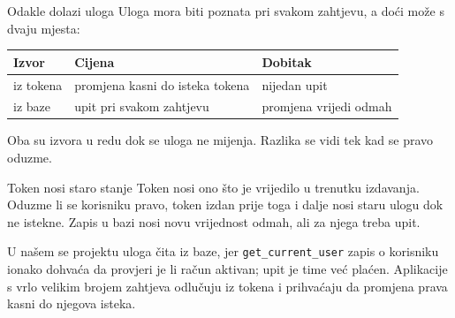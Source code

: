 \begin{frame}{Odakle dolazi uloga}
Uloga mora biti poznata pri svakom zahtjevu, a doći može s dvaju mjesta:

\vspace{0.4em}
\begin{center}
{\small
\setlength{\tabcolsep}{8pt}
\renewcommand{\arraystretch}{1.4}
\begin{tabular}{@{}lll@{}}
  \toprule
  \textbf{Izvor} & \textbf{Cijena} & \textbf{Dobitak} \\
  \midrule
  iz tokena & promjena kasni do isteka tokena & nijedan upit \\
  iz baze   & upit pri svakom zahtjevu        & promjena vrijedi odmah \\
  \bottomrule
\end{tabular}
}
\end{center}

\vspace{0.9em}
Oba su izvora u redu dok se uloga ne mijenja. Razlika se vidi tek kad se pravo oduzme.
\end{frame}

\begin{frame}{Token nosi staro stanje}
Token nosi ono što je vrijedilo u trenutku izdavanja. Oduzme li se korisniku pravo, token izdan prije toga i dalje nosi staru ulogu dok ne istekne. Zapis u bazi nosi novu vrijednost odmah, ali za njega treba upit.

\vspace{0.8em}
\begin{konvencija}
U našem se projektu uloga čita iz baze, jer \texttt{get\_current\_user} zapis o korisniku ionako dohvaća da provjeri je li račun aktivan; upit je time već plaćen. Aplikacije s vrlo velikim brojem zahtjeva odlučuju iz tokena i prihvaćaju da promjena prava kasni do njegova isteka.
\end{konvencija}
\end{frame}

